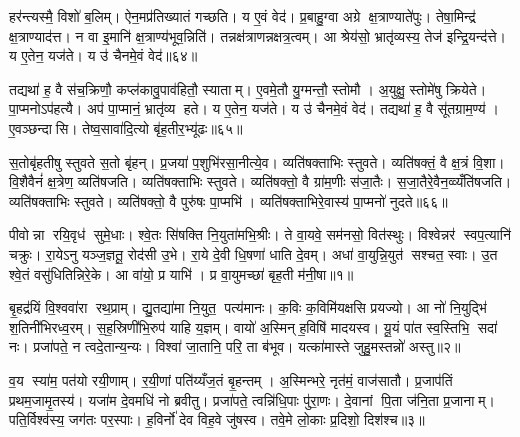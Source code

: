 हर॑न्त्यस्मै॒ विशो॑ ब॒लिम्। ऐन॒मप्र॑तिख्यातं गच्छति। य ए॒वं वेद॑। प्र॒बाहु॒ग्वा अग्रे क्ष॒त्राण्याते॑पुः। तेषा॒मिन्द्र॑ क्ष॒त्राण्याद॑त्त। न वा इ॒मानि॑ क्ष॒त्राण्य॑भूव॒न्निति॑। तन्नक्ष॑त्राणन्नक्षत्र॒त्वम्। आ श्रेय॑सो॒ भ्रातृ॑व्यस्य॒ तेज॑ इन्द्रि॒यन्द॑त्ते। य ए॒तेन॒ यज॑ते। य उ॑ चैनमे॒वं वेद॑॥६४॥

तद्यथा॑ ह॒ वै स॑च॒क्रिणौ॒ कप्ल॑कावु॒पाव॑हितौ॒ स्याताम्। ए॒वमे॒तौ यु॒ग्मन्तौ॒ स्तोमौ। अ॒युक्षु॒ स्तोमे॑षु क्रियेते। पा॒प्मनोऽप॑हत्यै। अप॑ पा॒प्मानं॒ भ्रातृ॑व्य हते। य ए॒तेन॒ यज॑ते। य उ॑ चैनमे॒वं वेद॑। तद्यथा॑ ह॒ वै सू॑तग्राम॒ण्य॑। ए॒वञ्छन्दासि। तेष्व॒सावा॑दि॒त्यो बृ॑ह॒तीर॒भ्यू॑ढः॥६५॥

स॒तोबृ॑हतीषु स्तुवते स॒तो बृ॑हन्। प्र॒जया॑ प॒शुभि॑रसा॒नीत्ये॒व। व्यति॑षक्ताभिः स्तुवते। व्यति॑षक्तं॒ वै क्ष॒त्रं वि॒शा। वि॒शैवैनं॑ क्ष॒त्रेण॒ व्यति॑षजति। व्यति॑षक्ताभिः स्तुवते। व्यति॑षक्तो॒ वै ग्रा॑म॒णीः स॑जा॒तैः। स॒जा॒तैरे॒वैन॒व्व्यँति॑षजति। व्यति॑षक्ताभिः स्तुवते। व्यति॑षक्तो॒ वै पुरु॑षः पा॒प्मभि॑। व्यति॑षक्ताभिरे॒वास्य॑ पा॒प्मनो॑ नुदते॥६६॥



\clearpage
{}
\setcounter{anuvakam}{0}
पीवोन्ना रयि॒वृध॑ सुमे॒धाः। श्वे॒तः सि॑षक्ति नि॒युता॑मभि॒श्रीः। ते वा॒यवे॒ सम॑नसो॒ वित॑स्थुः। विश्वेन्नर॑ स्वप॒त्यानि॑ चक्रुः। रा॒येऽनु यञ्ज॒ज्ञतू॒ रोद॑सी उ॒भे। रा॒ये दे॒वी धि॒षणा॑ धाति दे॒वम्। अधा॑ वा॒युन्नि॒युत॑ सश्चत॒ स्वाः। उ॒त श्वे॒तं वसु॑धितिन्निरे॒के। आ वा॑यो॒ प्र याभि॑। प्र वा॒युमच्छा॑ बृह॒ती म॑नी॒षा॥१॥

बृ॒हद्र॑यिं वि॒श्ववा॑रा रथ॒प्राम्। द्यु॒तद्या॑मा नि॒युत॒ पत्य॑मानः। क॒विः क॒विमि॑यक्षसि प्रयज्यो। आ नो॑ नि॒युद्भि॑ श॒तिनी॑भिरध्व॒रम्। स॒ह॒स्रिणी॑भि॒रुप॑ याहि य॒ज्ञम्। वायो॑ अ॒स्मिन् ह॒विषि॑ मादयस्व। यू॒यं पा॑त स्व॒स्तिभि॒ सदा॑ नः। प्रजा॑पते॒ न त्वदे॒तान्य॒न्यः। विश्वा॑ जा॒तानि॒ परि॒ ता ब॑भूव। यत्का॑मास्ते जुहु॒मस्तन्नो॑ अस्तु॥२॥

व॒य स्या॑म॒ पत॑यो रयी॒णाम्। र॒यी॒णां पति॑य्यँज॒तं बृ॒हन्तम्। अ॒स्मिन्भरे॒ नृत॑मं॒ वाज॑सातौ। प्र॒जाप॑तिं प्रथम॒जामृ॒तस्य॑। यजा॑म दे॒वमधि॑ नो ब्रवीतु। प्रजा॑पते॒ त्वन्नि॑धि॒पाः पु॑रा॒णः। दे॒वानां पि॒ता ज॑नि॒ता प्र॒जानाम्। पति॒र्विश्व॑स्य॒ जग॑तः पर॒स्पाः। ह॒विर्नो॑ देव विह॒वे जु॑षस्व। तवे॒मे लो॒काः प्र॒दिशो॒ दिश॑श्च॥३॥

